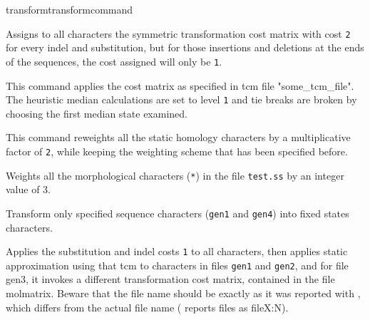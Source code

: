 \begin{command}{transform}{transformcommand}
\begin{poyexamples}
            {Assigns to all characters the symmetric transformation cost
            matrix with cost \texttt{2} for every indel and substitution, but for those
            insertions and deletions at the ends of the sequences, the cost
            assigned will only be \texttt{1}.}
            
            {This command applies the cost matrix as specified in tcm file 
            "some\_tcm\_file".  The heuristic median calculations are set to 
            level \texttt{1} and tie breaks are broken
            by choosing the first median state examined.}
                 
            {This command reweights all the static homology characters
            by a multiplicative factor of \texttt{2}, while keeping the weighting
            scheme that has been specified before.}
        
        
        
            {Weights all the morphological characters (\texttt{*}) in the file \texttt{test.ss} by an
            integer value of 3.}
        
            {Transform only specified sequence characters (\texttt{gen1} and
            \texttt{gen4}) into fixed states characters.}
    
            {Applies the substitution and indel costs \texttt{1} to all characters, then applies static approximation
            using that tcm to characters in files \texttt{gen1} and \texttt{gen2}, and for file
            gen3, it invokes a different transformation cost matrix, contained
            in the file molmatrix. Beware that the file name should be exactly
            as it was reported with , which differs from the actual
            file name ( reports files as fileX:N).}
        

\end{poyexamples}
\end{command}
